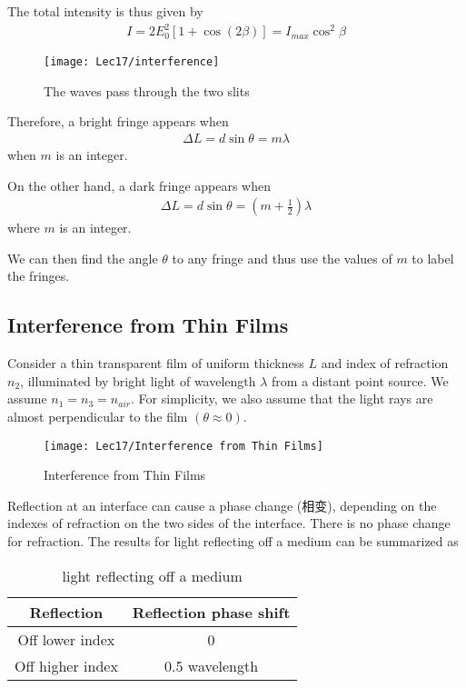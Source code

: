 The total intensity is thus given by 
\begin{align*}
    I=2E_0^2\left[ 1+\cos(2\beta) \right]=I_{max}\cos^2\beta
\end{align*}


\begin{figure}[H]
    \centering
    \texttt{[image: Lec17/interference]}
    \caption{The waves pass through the two slits}
\end{figure}

Therefore, a bright fringe appears when
\begin{align*}
    \Delta L=d\sin\theta=m\lambda
\end{align*}
when $m$ is an integer.

On the other hand, a dark fringe appears when 
\begin{align*}
    \Delta L=d\sin\theta = \left(m+\frac{1}{2}\right)\lambda
\end{align*}
where $m$ is an integer. 

We can then find the angle $\theta$ to any fringe and thus use the values of $m$ to label the fringes.

\subsection{Interference from Thin Films}
Consider a thin transparent film of uniform thickness $L$ and index of refraction $n_2$, illuminated by bright light of wavelength $\lambda$ from a distant point source. We assume $n_1=n_3=n_{air}$. For simplicity, we also assume that the light rays are almost perpendicular to the film $(\theta\approx 0)$. 

\begin{figure}[H]
    \centering
    \texttt{[image: Lec17/Interference from Thin Films]}
    \caption{Interference from Thin Films}
\end{figure}

Reflection at an interface can cause a phase change (相变), depending on the indexes of refraction on the two sides of the interface. There is no phase change for refraction. The results for light reflecting off a medium can be summarized as 
\begin{table}[H]
    \centering
    \begin{tabular}[c]{|c|c|}\hline
        Reflection & Reflection phase shift\\ \hline
        Off lower index & 0\\
        Off higher index & 0.5 wavelength\\ \hline
    \end{tabular}
    \caption{light reflecting off a medium }
\end{table}

